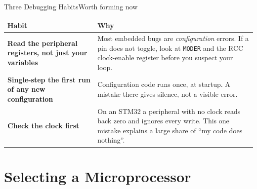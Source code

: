 \documentclass[9pt,aspectratio=169,xcolor=table]{beamer}
\begin{document}
\begin{frame}{Three Debugging Habits}{Worth forming now}
    \begin{center}
    {\small
    \striped
    \begin{tabular}{@{}R{.3\textwidth} R{.56\textwidth}@{}}
        \toprule
        \textbf{Habit} & \textbf{Why} \\
        \midrule
        \textbf{Read the peripheral registers, not just your variables} & Most embedded bugs are \emph{configuration} errors. If a pin does not toggle, look at \texttt{MODER} and the RCC clock-enable register before you suspect your loop. \\
        \textbf{Single-step the first run of any new configuration} & Configuration code runs once, at startup. A mistake there gives silence, not a visible error. \\
        \textbf{Check the clock first} & On an STM32 a peripheral with no clock reads back zero and ignores every write. This one mistake explains a large share of ``my code does nothing''. \\
        \bottomrule
    \end{tabular}}
    \end{center}
\end{frame}


\section{Selecting a Microprocessor}
\end{document}
